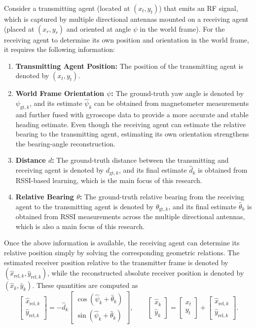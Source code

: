 \documentclass[subscriptcorrection,upint,varvw,barcolor=Goldenrod3,mathalfa=cal=euler,balance,hyphenate,pdf-a]{asmejour}
\begin{document}
Consider a transmitting agent (located at $(x_t, y_t)$) that emits an RF signal, which is captured by multiple directional antennas mounted on a receiving agent (placed at $(x_r, y_r)$ and oriented at angle $\psi$ in the world frame). For the receiving agent to determine its own position and orientation in the world frame, it requires the following information:
\begin{enumerate}
\item \textbf{Transmitting Agent Position:} The position of the transmitting agent is denoted by $(x_t, y_t)$.
\item \textbf{World Frame Orientation $\psi$:} The ground-truth yaw angle is denoted by $\psi_{\mathrm{gt},k}$, and its estimate $\hat{\psi}_k$ can be obtained from magnetometer measurements and further fused with gyroscope data to provide a more accurate and stable heading estimate. Even though the receiving agent can estimate the relative bearing to the transmitting agent, estimating its own orientation strengthens the bearing-angle reconstruction.
\item \textbf{Distance $d$:} The ground-truth distance between the transmitting and receiving agent is denoted by $d_{\mathrm{gt},k}$, and its final estimate $\hat{d}_k$ is obtained from RSSI-based learning, which is the main focus of this research.
\item \textbf{Relative Bearing $\theta$:} The ground-truth relative bearing from the receiving agent to the transmitting agent is denoted by $\theta_{\mathrm{gt},k}$, and its final estimate $\hat{\theta}_k$ is obtained from RSSI measurements across the multiple directional antennas, which is also a main focus of this research.
\end{enumerate}

Once the above information is available, the receiving agent can determine its relative position simply by solving the corresponding geometric relations. The estimated receiver position relative to the transmitter frame is denoted by $(\hat{x}_{\mathrm{rel},k},\hat{y}_{\mathrm{rel},k})$, while the reconstructed absolute receiver position is denoted by $(\hat{x}_k,\hat{y}_k)$. These quantities are computed as
\begin{equation}
\begin{bmatrix}\hat{x}_{\mathrm{rel},k} \\
\hat{y}_{\mathrm{rel},k}\end{bmatrix}
= -\hat{d}_k \begin{bmatrix}\cos(\hat{\psi}_k + \hat{\theta}_k) \\
\sin(\hat{\psi}_k + \hat{\theta}_k)\end{bmatrix},
\qquad
\begin{bmatrix}\hat{x}_k \\
\hat{y}_k\end{bmatrix}
= \begin{bmatrix}x_t \\
y_t\end{bmatrix}
+ \begin{bmatrix}\hat{x}_{\mathrm{rel},k} \\
\hat{y}_{\mathrm{rel},k}\end{bmatrix}.
\label{eqn:position}
\end{equation}
\end{document}
